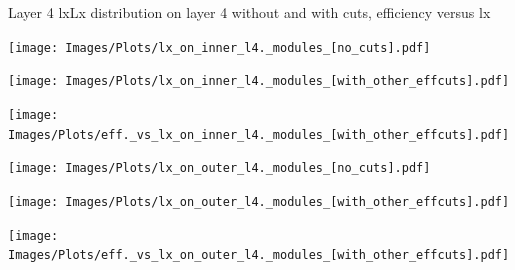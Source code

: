 \documentclass{beamer}
\begin{document}
\begin{frame}{Layer 4 lx}{Lx distribution on layer 4 without and with cuts, efficiency versus lx}
\begin{minipage}{0.32\textwidth}
  \centering
  \texttt{[image: Images/Plots/lx\_on\_inner\_l4.\_modules\_[no\_cuts].pdf]}
\end{minipage}%
\hspace{0.01\textwidth}%
\begin{minipage}{0.32\textwidth}
  \centering
  \texttt{[image: Images/Plots/lx\_on\_inner\_l4.\_modules\_[with\_other\_effcuts].pdf]}
\end{minipage}%
\hspace{0.01\textwidth}%
\begin{minipage}{0.32\textwidth}
  \centering
  \texttt{[image: Images/Plots/eff.\_vs\_lx\_on\_inner\_l4.\_modules\_[with\_other\_effcuts].pdf]}
\end{minipage}
\begin{minipage}{0.32\textwidth}
  \centering
  \texttt{[image: Images/Plots/lx\_on\_outer\_l4.\_modules\_[no\_cuts].pdf]}
\end{minipage}%
\hspace{0.01\textwidth}%
\begin{minipage}{0.32\textwidth}
  \centering
  \texttt{[image: Images/Plots/lx\_on\_outer\_l4.\_modules\_[with\_other\_effcuts].pdf]}
\end{minipage}%
\hspace{0.01\textwidth}%
\begin{minipage}{0.32\textwidth}
  \centering
  \texttt{[image: Images/Plots/eff.\_vs\_lx\_on\_outer\_l4.\_modules\_[with\_other\_effcuts].pdf]}
\end{minipage}
\end{frame}
\end{document}
